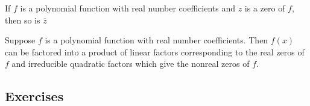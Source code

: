 \begin{theorem}
    If $f$ is a polynomial function with real number coefficients and $z$ is a zero of $f$, then so is $\overline{z}$
\end{theorem}

\begin{theorem}
    Suppose $f$ is a polynomial function with real number coefficients. Then $f(x)$ can be factored into a product of linear factors corresponding to the real zeros of $f$ and irreducible quadratic factors which give the nonreal zeros of $f$.
\end{theorem}

\subsection{Exercises}
